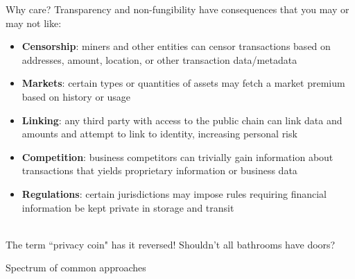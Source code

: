 \documentclass[aspectratio=169]{beamer}
\begin{document}
\begin{frame}{Why care?}
Transparency and non-fungibility have consequences that you may or may not like:

\begin{itemize}
\item \textbf{Censorship}: miners and other entities can censor transactions based on addresses, amount, location, or other transaction data/metadata
\item \textbf{Markets}: certain types or quantities of assets may fetch a market premium based on history or usage
\item \textbf{Linking}: any third party with access to the public chain can link data and amounts and attempt to link to identity, increasing personal risk
\item \textbf{Competition}: business competitors can trivially gain information about transactions that yields proprietary information or business data
\item \textbf{Regulations}: certain jurisdictions may impose rules requiring financial information be kept private in storage and transit \\~\\
\end{itemize}

The term ``privacy coin" has it reversed! Shouldn't all bathrooms have doors?
\end{frame}


\begin{frame}{Spectrum of common approaches}
\begin{figure}
\centering
{}
\end{figure}
\end{frame}
\end{document}
